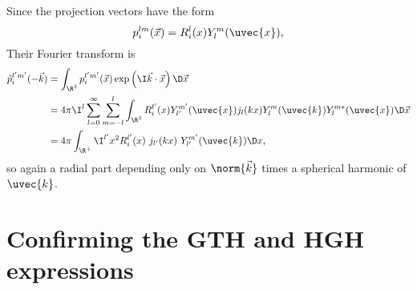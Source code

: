 \documentclass{MFHarticle}
\begin{document}
Since the projection vectors have the form
\[ p_i^{lm}(\vec{x}) = R_i^l(x) Y_l^m(\uvec{x}), \]
Their Fourier transform is
\begin{align*}
	\hat{p}_i^{l'm'}(-\vec{k})
	&= \int_{\R^3} p_i^{l'm'}(\vec{x}) \exp\left(\I \vec{k} \cdot \vec{x}\right) \D\vec{x} \\
	&= 4 \pi \I^l \sum_{l = 0}^\infty
	\sum_{m = -l}^l \int_{\R^3}
	R_i^{l'}(x) Y_{l'}^{m'}(\uvec{x})
	j_l(k x) Y_l^m(\uvec{k}) Y_l^{m\ast}(\uvec{x})
	\D\vec{x} \\
	&= 4 \pi
	\int_{\R^+} \I^{l'} x^2 R_i^{l'}(x) \ j_{l'}(k x)
	\
	Y_{l'}^{m'}(\uvec{k}) \D x,
\end{align*}
so again a radial part depending only on $\norm{\vec{k}}$
times a spherical harmonic of $\uvec{k}$.


\section[
Confirming the GTH and HGH expressions
]{Confirming the GTH and HGH expressions \cite{Goedecker1996,Hartwigsen1998}}






\end{document}
